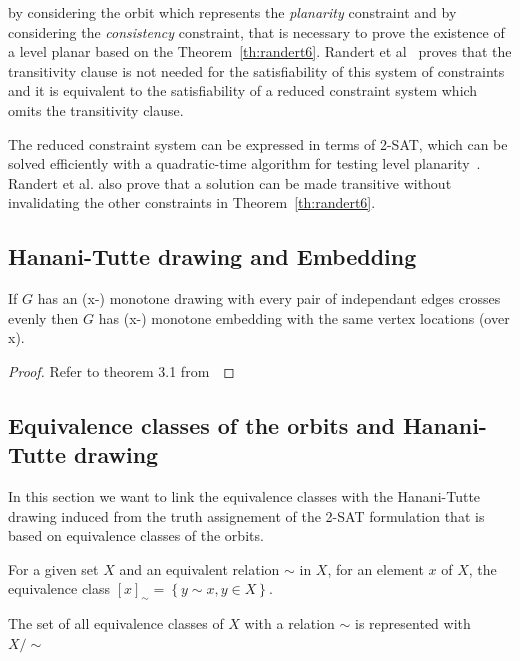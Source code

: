 
by considering the orbit which represents the \textit{planarity} constraint and by considering the \textit{consistency} constraint, 
that is necessary to prove the existence of a level planar based on the Theorem~\ref{th:randert6}. Randert et al~\cite{randerath2001satisfiability} 
proves that the transitivity clause is not needed for the satisfiability of this system of constraints and it is equivalent to 
the satisfiability of a reduced constraint system which omits the transitivity clause. 

The reduced constraint system can be expressed in terms of 2-SAT, which can be solved efficiently with a quadratic-time 
algorithm for testing level planarity~\cite{krom1967decision}. Randert et al. also prove that a solution can be made transitive 
without invalidating the other constraints in Theorem~\ref{th:randert6}.

\subsection{Hanani-Tutte drawing and Embedding}%
\label{sub:Hanani-Tutte drawing and Embedding}

\begin{theorem}
    \label{th:strongHT}
   If $G$ has an (x-) monotone drawing with every pair of independant edges crosses evenly then $G$ has (x-) monotone
   embedding with the same vertex locations (over x). 
\end{theorem}
\begin{proof}
    Refer to theorem 3.1 from~\cite{fulek2012hanani} 
\end{proof}

\subsection{Equivalence classes of the orbits and Hanani-Tutte drawing }%
\label{sub:eqcl&htd}
In this section we want to link the equivalence classes with the Hanani-Tutte drawing induced from the truth assignement 
of the 2-SAT formulation that is based on equivalence classes of the orbits.  

\begin{definition}
    For a given set $X$ and an equivalent relation $\sim$ in $X$, for an element $x$ of $X$, the 
    equivalence class $[x]_\sim = \left\{ y \sim x, y \in X\right\}$. 

    The set of all equivalence classes of $X$ with a relation $\sim$ is represented with $X/\sim$ 
\end{definition}

